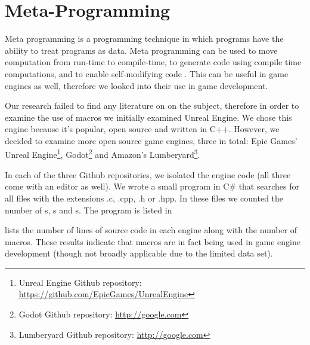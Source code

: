 \section{Meta-Programming} \label{sec:meta-programming} 
Meta programming is a programming technique in which programs have the ability to treat programs as data. Meta programming can be used to move computation from run-time to compile-time, to generate code using compile time computations, and to enable self-modifying code \cite{chlipala2010ur} \cite{czarnecki2000generative}. This can be useful in game engines as well, therefore we looked into their use in game development.

Our research failed to find any literature on on the subject, therefore in order to examine the use of macros we initially examined Unreal Engine. We chose this engine because it's popular, open source and written in C++. However, we decided to examine more open source game engines, three in total: Epic Games' Unreal Engine\footnote{Unreal Engine Github repository: \url{https://github.com/EpicGames/UnrealEngine}}, Godot\footnote{Godot Github repository: \url{http://google.com}} and Amazon's Lumberyard\footnote{Lumberyard Github repository: \url{http://google.com}}.

In each of the three Github repositories, we isolated the engine code (all three come with an editor as well). We wrote a small program in C\# that searches for all files with the extensions .c, .cpp, .h or .hpp. In these files we counted the number of s, s and s. The program is listed in 

 lists the number of lines of source code in each engine along with the number of macros. These results indicate that macros are in fact being used in game engine development (though not broadly applicable due to the limited data set).


